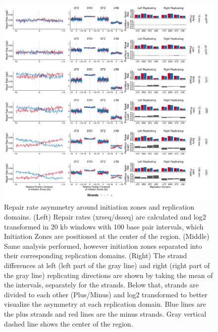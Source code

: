 \begin{figure}[H]
    \begin{center}
    \includegraphics[width=\textwidth]{Chapters/4_results/figures/fig6}
    \caption[Repair rate asymmetry around initiation zones and replication domains.]{Repair rate asymmetry around initiation zones and replication domains. (Left) Repair rates (\gls{xrseq}/\gls{dsseq}) are calculated and log2 transformed in 20 \gls{kb} windows with 100 base pair intervals, which Initiation Zones are positioned at the center of the region. (Middle) Same analysis performed, however initiation zones separated into their corresponding replication domains. (Right) The strand differences at left (left part of the gray line) and right (right part of the gray line) replicating directions are shown by taking the mean of the intervals, separately for the strands. Below that, strands are divided to each other (Plus/Minus) and log2 transformed to better visualize the asymmetry at each replication domain. Blue lines are the plus strands and red lines are the minus strands. Gray vertical dashed line shows the center of the region.}
    \label{fig:repairrate}
    \end{center}
    \end{figure}

                                                                   
